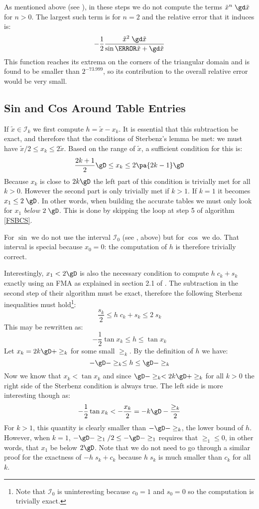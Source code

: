 \documentclass[10pt, a4paper, twoside]{basestyle}
\newcommand{\red}[1]{\tilde{#1}}
\begin{document}
As mentioned above (see ), in these steps we do not compute the terms ${\red x}^n \; \gd \red x$ for $n > 0$.  The largest such term is for $n = 2$ and the relative error that it induces is:
\[
-\frac{1}{2} \frac{{\red x}^2 \; \gd \red x}{\sin\of{\red x + \gd \red x}}
\]
This function reaches its extrema on the corners of the triangular domain and is found to be smaller than $2^{-73.999}$, so its contribution to the overall relative error would be very small.

\subsection*{Sin and Cos Around Table Entries}\label{subssterbenz}

If $\red x \in \mathscr{I}_k$ we first compute $h = \red x - x_k$.  It is essential that this subtraction be exact, and therefore that the conditions of Sterbenz's lemma be met: we must have $\red x / 2 \le x_k \le 2 \red x$.  Based on the range of $\red x$, a sufficient condition for this is:
\[
\frac{2 k + 1}{2} \gD \le x_k \le 2 \pa{2 k - 1} \gD
\]
Because $x_k$ is close to $2 k \gD$ the left part of this condition is trivially met for all $k > 0$.  However the second part is only trivially met if $k > 1$.  If $k = 1$ it becomes $x_1 \le 2 \; \gD$.  In other words, when building the accurate tables we must only look for $x_1$ \emph{below} $2 \; \gD$.  This is done by skipping the loop at step 5 of algorithm \ref{FSBCS}.

For $\sin$ we do not use the interval $\mathscr{I}_0$ (see , above) but for $\cos$ we do.  That interval is special because $x_0 = 0$: the computation of $h$ is therefore trivially correct.

Interestingly, $x_1 < 2 \gD$ is also the necessary condition to compute $h \; c_k + s_k$ exactly using an FMA as explained in section 2.1 of \cite{StehléZimmermann2005}.  The subtraction in the second step of their algorithm must be exact, therefore the following Sterbenz inequalities must hold\footnote{Note that $\mathscr{I}_0$ is uninteresting because $c_0 = 1$ and $s_0 = 0$ so the computation is trivially exact.}:
\[
\frac{s_k}{2} \le h \; c_k + s_k \le 2 \; s_k
\]
This may be rewritten as:
\[
-\frac{1}{2} \tan x_k \le h \le \tan x_k
\]
Let $x_k = 2 k \gD + \ge_k$ for some small $\ge_k$.  By the definition of $h$ we have:
\[
-\gD - \ge_k \le h \le \gD - \ge_k
\]
Now we know that $x_k < \tan x_k$ and since $\gD - \ge_k < 2 k \gD + \ge_k$ for all $k > 0$ the right side of the Sterbenz condition is always true.  The left side is more interesting though as:
\[
-\frac{1}{2} \tan x_k < -\frac{x_k}{2} = -k \gD - \frac{\ge_k}{2}
\]
For $k > 1$, this quantity is clearly smaller than $-\gD - \ge_k$, the lower bound of $h$.  However, when $k = 1$, $-\gD - \ge_1 / 2 \le -\gD - \ge_1$ requires that $\ge_1 \le 0$, in other words, that $x_1$ be below $2 \gD$.  Note that we do not need to go through a similar proof for the exactness of $-h \; s_k + c_k$ because $h \; s_k$ is much smaller than $c_k$ for all $k$.
\end{document}
